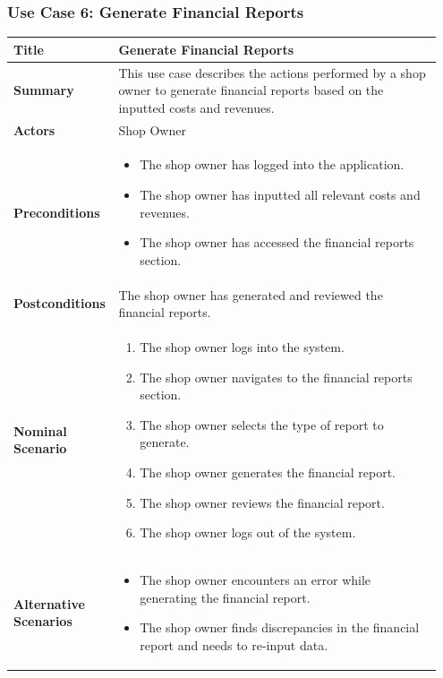 \subsubsection{Use Case 6: Generate Financial Reports}
\begin{longtable}{|p{0.2\linewidth}|p{0.75\linewidth}|}
\hline
\textbf{Title} & Generate Financial Reports \\
\hline
\textbf{Summary} & This use case describes the actions performed by a shop owner to generate financial reports based on the inputted costs and revenues. \\
\hline
\textbf{Actors} & Shop Owner \\
\hline
\textbf{Preconditions} & 
\begin{itemize}
    \item The shop owner has logged into the application.
    \item The shop owner has inputted all relevant costs and revenues.
    \item The shop owner has accessed the financial reports section.
\end{itemize} \\
\hline
\textbf{Postconditions} & The shop owner has generated and reviewed the financial reports. \\
\hline
\textbf{Nominal Scenario} &
\begin{enumerate}
    \item The shop owner logs into the system.
    \item The shop owner navigates to the financial reports section.
    \item The shop owner selects the type of report to generate.
    \item The shop owner generates the financial report.
    \item The shop owner reviews the financial report.
    \item The shop owner logs out of the system.
\end{enumerate} \\
\hline
\textbf{Alternative Scenarios} &
\begin{itemize}
    \item The shop owner encounters an error while generating the financial report.
    \item The shop owner finds discrepancies in the financial report and needs to re-input data.
\end{itemize} \\
\hline
\end{longtable}

